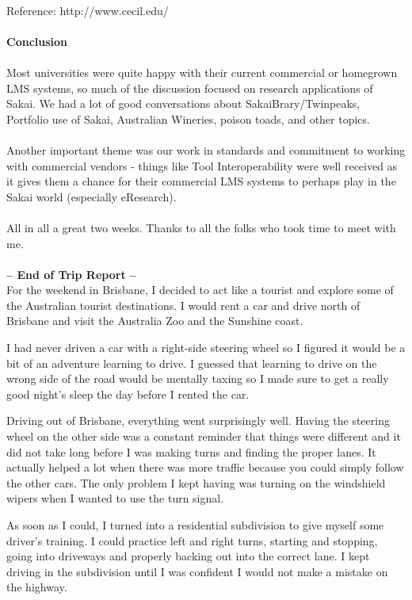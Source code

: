 \documentclass[12pt]{book}
\begin{document}
\\
Reference: http://www.cecil.edu/\\
\\
{\bf Conclusion}\\
\\
Most universities were quite happy with their current commercial or homegrown LMS systems, so much of the discussion focused on research applications of Sakai.   We had a lot of good conversations about SakaiBrary\slash Twinpeaks, Portfolio use of Sakai, Australian Wineries, poison toads, and other topics.\\
\\
Another important theme was our work in standards and commitment to working with commercial vendors - things like Tool Interoperability were well received as it gives them a chance for their commercial LMS systems to perhaps play in the Sakai world (especially eResearch).    \\
\\
All in all a great two weeks.   Thanks to all the folks who took time to meet with me.\\
\\
{\bf -- End of Trip Report --}\\

For the weekend in Brisbane, I decided to act like a tourist and
explore some of the Australian tourist destinations.  I would
rent a car and drive north of Brisbane and visit the Australia
Zoo and the Sunshine coast.

I had never driven a car with a right-side steering wheel so I
figured it would be a bit of an adventure learning to drive.
I guessed that learning to drive on the wrong side of the road
would be mentally taxing so I made sure to get a really good
night's sleep the day before I rented the car.

Driving out of Brisbane,
everything went surprisingly well.  Having the steering
wheel on the other side was a constant reminder that
things were different and it did not take long before
I was making turns and finding the proper lanes.  It actually
helped a lot when there was more traffic because you
could simply follow the other cars.  The only
problem I kept having was turning on the windshield wipers
when I wanted to use the turn signal.

As soon as I could, I turned into a residential subdivision
to give myself some driver's training.   I could practice
left and right turns, starting and stopping, going into
driveways and properly backing out into the correct lane.
I kept driving in the subdivision until I was confident
I would not make a mistake on the highway.
\end{document}
